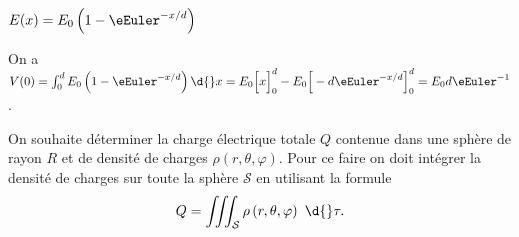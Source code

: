 

\begin{enonce}
	$E(x) = E_0 \left( 1 - \eEuler^{-x/d} \right)$
\end{enonce}




\begin{corrige}
On a $V(0) = \int_{0}^{d} E_0 \left( 1 - \eEuler^{-x/d} \right) \d{}x =
		E_0 \Big[ x  \Big]^{d}_{0} - E_0 \Big[ -d\eEuler^{-x/d}  \Big]^{d}_{0} = E_0d\eEuler^{-1}$.
\end{corrige}


\finEntrainement












\hauteurLargeurCadreReponse		{7mm}{8cm}
\typeEntrainement				{} %
\initialisationEntrainement


On souhaite déterminer la charge électrique totale $Q$ contenue dans une sphère de rayon $R$ et de densité de charges $\rho\left(r,\theta,\varphi\right)$. Pour ce faire on doit intégrer la densité de charges sur toute la sphère $\mathcal{S}$ en utilisant la formule \vspace{-1mm}
\[
Q = \iiint_{\mathcal{S}} \rho\left(r,\theta,\varphi\right) \ \d{}\tau.
\]

